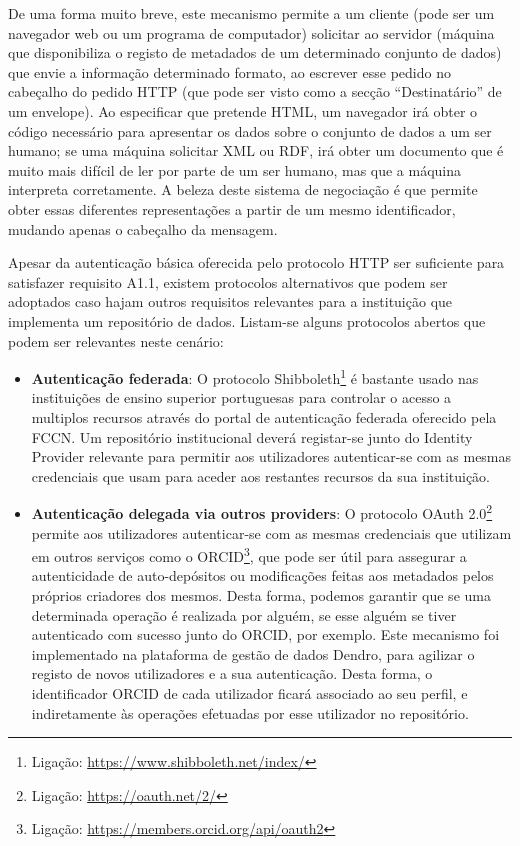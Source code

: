 \documentclass[sigconf,nonacm]{acmart}
\begin{document}
De uma forma muito breve, este mecanismo permite a um cliente (pode ser um navegador web ou um programa de computador) solicitar ao servidor (máquina que disponibiliza o registo de metadados de um determinado conjunto de dados) que envie a informação determinado formato, ao escrever esse pedido no cabeçalho do pedido HTTP (que pode ser visto como a secção ``Destinatário'' de um envelope). Ao especificar que pretende HTML, um navegador irá obter o código necessário para apresentar os dados sobre o conjunto de dados a um ser humano; se uma máquina solicitar XML ou RDF, irá obter um documento que é muito mais difícil de ler por parte de um ser humano, mas que a máquina interpreta corretamente. A beleza deste sistema de negociação é que permite obter essas diferentes representações a partir de um mesmo identificador, mudando apenas o cabeçalho da mensagem.

Apesar da autenticação básica oferecida pelo protocolo HTTP ser suficiente para satisfazer requisito A1.1, existem protocolos alternativos que podem ser adoptados caso hajam outros requisitos relevantes para a instituição que implementa um repositório de dados. Listam-se alguns protocolos abertos que podem ser relevantes neste cenário:

\begin{itemize}
  \item \textbf{Autenticação federada}: O protocolo Shibboleth\footnote{Ligação: \url{https://www.shibboleth.net/index/}} é bastante usado nas instituições de ensino superior portuguesas para controlar o acesso a multiplos recursos através do portal de autenticação federada oferecido pela FCCN. Um repositório institucional deverá registar-se junto do Identity Provider relevante para permitir aos utilizadores autenticar-se com as mesmas credenciais que usam para aceder aos restantes recursos da sua instituição.
  \item \textbf{Autenticação delegada via outros providers}: O protocolo OAuth 2.0\footnote{Ligação: \url{https://oauth.net/2/}} permite aos utilizadores autenticar-se com as mesmas credenciais que utilizam em outros serviços como o ORCID\footnote{Ligação: \url{https://members.orcid.org/api/oauth2}}, que pode ser útil para assegurar a autenticidade de auto-depósitos ou modificações feitas aos metadados pelos próprios criadores dos mesmos. Desta forma, podemos garantir que se uma determinada operação é realizada por alguém, se esse alguém se tiver autenticado com sucesso junto do ORCID, por exemplo. Este mecanismo foi implementado na plataforma de gestão de dados Dendro, para agilizar o registo de novos utilizadores e a sua autenticação. Desta forma, o identificador ORCID de cada utilizador ficará associado ao seu perfil, e indiretamente às operações efetuadas por esse utilizador no repositório.
\end{itemize}
\end{document}
